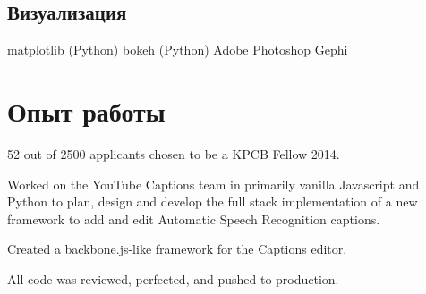 \documentclass[a4paper]{resume}
\begin{document}
\begin{minipage}[t]{0.33\textwidth}
\subsection{Визуализация}
matplotlib (Python) \textbullet{} bokeh (Python) \textbullet{} Adobe Photoshop \textbullet{} Gephi
\sectionspace



\end{minipage} %
\hfill
%
%
\begin{minipage}[t]{0.66\textwidth} %


\section{Опыт работы}


\vspace{\topsep} %
\begin{tightitemize}
\item 52 out of 2500 applicants chosen to be a KPCB Fellow 2014.
\end{tightitemize}

\sectionspace %



\begin{tightitemize}
\item Worked on the YouTube Captions team in primarily vanilla Javascript and Python to plan, design and develop the full stack implementation of a new framework to add and edit Automatic Speech Recognition captions.
\item Created a backbone.js-like framework for the Captions editor.
\item All code was reviewed, perfected, and pushed to production.
\end{tightitemize}


\end{minipage}
\end{document}
